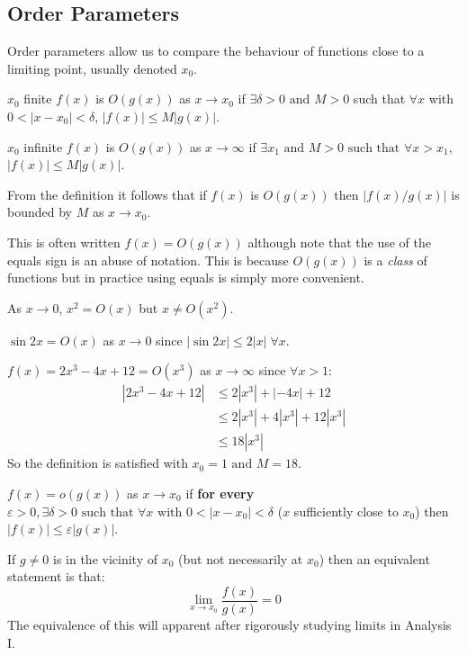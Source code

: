 \documentclass[../main.tex]{subfiles}
\begin{document}
\subsection{Order Parameters}
Order parameters allow us to compare the behaviour of functions close to a limiting point, usually denoted $x_0$.
\begin{definition}
  \begin{proofcases}
    \begin{case}{$x_0$ finite}
      $f(x)$ is $O(g(x))$ as $x \to x_0$ if $\exists \delta > 0 \text{ and } M > 0$ such that $\forall x$ with $0 < |x - x_0| < \delta$, $|f(x)| \leq M |g(x)|$.
    \end{case}
    \begin{case}{$x_0$ infinite}
      $f(x)$ is $O(g(x))$ as $x \to \infty$ if $\exists x_1 \text{ and } M > 0 \text{ such that } \forall x > x_1$, $|f(x)| \leq M|g(x)|$.
    \end{case}
  \end{proofcases}
\end{definition}
From the definition it follows that if $f(x)$ is $O(g(x))$ then $|f(x)/g(x)|$ is bounded by $M$ as $x \to x_0$.
\begin{remark}[Notation]
This is often written $f(x) = O(g(x))$ although note that the use of the equals sign is an abuse of notation.
This is because $O(g(x))$ is a \textit{class} of functions but in practice using equals is simply more convenient.
\end{remark}
\begin{example}
  As $x \to 0$, $x^2 = O(x)$ but $x \neq O(x^2)$.
\end{example}
\begin{example}
  $\sin 2x = O(x)$ as $x \to 0$ since $|\sin 2x| \leq 2|x|\;\forall x$.
\end{example}
\begin{example}
  $f(x) = 2x^3 - 4x + 12 = O(x^3)$ as $x \to \infty$ since $\forall x > 1$:
  \begin{align*}
    |2x^3 - 4x + 12| &\leq 2|x^3| + |-4x| + 12 \\
                     &\leq 2|x^3| + 4|x^3| + 12|x^3| \\
                     &\leq 18|x^3|
  \end{align*}
  So the definition is satisfied with $x_0 = 1 \text{ and } M = 18$.
\end{example}
\begin{definition}
  $f(x) = o(g(x))$ as $x \to x_0$ if \textbf{for every} $\varepsilon > 0, \exists \delta > 0 \text{ such that } \forall x \text{ with } 0 < |x - x_0| < \delta$ ($x$ sufficiently close to $x_0$) then $|f(x)| \leq \varepsilon |g(x)|$.

  If $g \neq 0$ is in the vicinity of $x_0$ (but not necessarily at $x_0$) then an equivalent statement is that:
  \[
    \lim_{x \to x_0} \frac{f(x)}{g(x)} = 0
  \]
  The equivalence of this will apparent after rigorously studying limits in Analysis I.
\end{definition}
\end{document}
